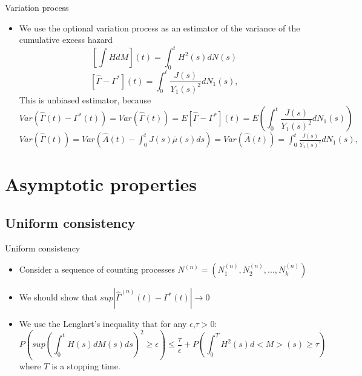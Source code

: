 \documentclass{beamer}
\begin{document}
\begin{frame}{Variation process}
\begin{itemize}
  \item We use the optional variation process as an estimator of the variance of the cumulative excess hazard $$[\int HdM](t) = \int_0^t H^2(s) dN(s) $$
 \begin{equation}
 \label{eq3}
      [\hat\Gamma - \Gamma^*](t) = \int_0^t \frac{J(s)}{Y_1(s)^2} dN_1(s),
 \end{equation}
 \newline 
 This is unbiased estimator, because
 $$Var(\hat\Gamma(t) - \Gamma^*(t)) = Var(\hat\Gamma(t)) = E[\hat\Gamma - \Gamma^*](t) = E(\int_0^t \frac{J(s)}{Y_1(s)^2} dN_1(s)) $$
 \newline
 $ Var(\hat\Gamma(t)) = Var( \hat A(t) - \int_0^t J(s) \bar\mu(s) ds) = Var(\hat A(t)) = \int_0^t \frac{J(s)}{Y_1(s)^2} dN_1(s) ,$
 
     
\end{itemize}
\end{frame}

\section{Asymptotic properties}
\subsection{Uniform consistency}
\begin{frame}{Uniform consistency}
\begin{itemize}
\item Consider a sequence of counting processes $N^{(n)} = (N_1^{(n)},N_2^{(n)}, ..., N_k^{(n)})$
\item We should show that $sup|\hat\Gamma^{(n)}(t) - \Gamma^*(t)| \rightarrow 0$  
\item We use the Lenglart's inequality that for any $\epsilon$,$\tau > 0$:
$$P(sup(\int_0^t H(s)dM(s)ds)^2  \geq \epsilon) \leq \frac{\tau}{\epsilon} + P(\int_0^T H^2(s)d<M>(s) \geq \tau) $$
\newline
where $T$ is a stopping time.
\end{itemize}
 \end{frame}
\end{document}
